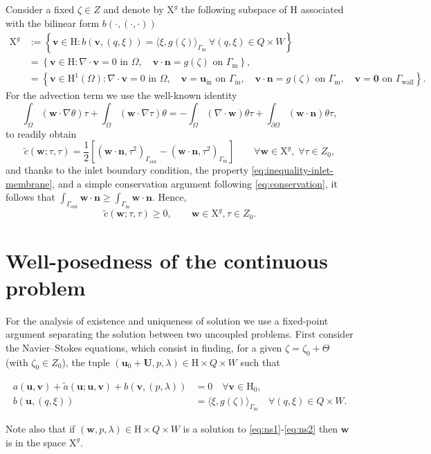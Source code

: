 \documentclass[onefignum,onetabnum,reqno,a4paper,final]{siamart250211}
\def\O{\Omega}
\newcommand\bu{\boldsymbol{u}}
\newcommand\bv{\boldsymbol{v}}
\newcommand\bn{\boldsymbol{n}}
\newcommand\bw{\boldsymbol{w}}
\newcommand\0{\mathbf{0}}
\newcommand\bU{\boldsymbol{U}}
\newcommand\bH{\boldsymbol{\mathrm{H}}}
\newcommand\bX{\boldsymbol{\mathrm{X}}}
\newcommand\bzero{\boldsymbol{0}}
\renewcommand\O{\Omega}
\newcommand\Gm{\Gamma_{\mathrm{m}}}
\newcommand\Gi{\Gamma_{\mathrm{in}}}
\newcommand\Go{\Gamma_{\mathrm{out}}}
\newcommand\Gw{\Gamma_{\mathrm{wall}}}
\newcommand\buin{\boldsymbol{u}_{\mathrm{in}}}
\numberwithin{figure}{section}
\numberwithin{table}{section}
\begin{document}
Consider a fixed $\zeta\in Z$ and denote  by $\bX^g$ the following subspace of $\bH$ associated with the bilinear form  $b(\cdot,(\cdot,\cdot))$ 
\begin{align}
	\label{eq:X}
	\bX^g&:=\left\{\bv\in\bH: b(\bv,(q,\xi))=\langle \xi, g(\zeta)\rangle_{\Gm} \ \forall (q,\xi)\in Q\times W \right\}\nonumber\\
	& =\left\{\bv\in\bH: \nabla\cdot\bv=0 \text{ in }\O,  \quad \bv\cdot\bn =g(\zeta) \text{ on }\Gm\right\},\\
	& =\left\{\bv\in\bH^1(\Omega): \nabla\cdot\bv=0 \text{ in }\O, \quad \bv =\buin \text{ on }\Gi, \quad \bv\cdot\bn= g(\zeta) \text{ on }\Gm, \quad \bv = \bzero  \text{ on }\Gw\right\}.	\nonumber
\end{align}
For the advection term we use the well-known identity 
\[\int_\Omega (\bw \cdot \nabla \theta) \tau + \int_\Omega (\bw \cdot \nabla \tau) \theta  = -\int_\Omega (\nabla\cdot \bw) \theta \tau + \int_{\partial\Omega}(\bw \cdot \bn) \theta \tau, \]
to readily obtain 
\begin{equation}\label{tc-form}
	\widetilde{c}(\bw;\tau,\tau)=\frac{1}{2}[(\bw\cdot\bn,\tau^2)_{\Go} -(\bw\cdot\bn,\tau^2)_{\Gm} ]  \qquad \forall \bw\in\bX^g,\; \forall \tau\in Z_0,
\end{equation}
and thanks to the inlet boundary condition, the property \eqref{eq:inequality-inlet-membrane}, and a simple conservation argument following \eqref{eq:conservation}, it follows that $\int_{\Go}  \bw\cdot\bn \geq \int_{\Gm} \bw\cdot\bn $. Hence,
\begin{equation}\label{eq:ct-pos}
	\widetilde{c}(\bw;\tau,\tau)\geq 0, \qquad \bw\in\bX^g, \tau\in Z_0.
\end{equation}

\section{Well-posedness of the continuous problem}\label{sec:wellp}
For the analysis of existence and uniqueness of solution we use a fixed-point argument separating the solution between two uncoupled problems. First consider the Navier--Stokes equations, which consist in finding, for a given $\zeta = \zeta_0 + \Theta$ (with $\zeta_0\in Z_0$), the tuple  $(\bu_0+\bU,p,\lambda) \in \bH\times Q\times W$ such that   
\begin{linenomath}
	\begin{subequations}
		\begin{align}
			\label{eq:ns1}   a(\bu,\bv)  + \widetilde{a}(\bu;\bu,\bv) 
   + b(\bv,(p,\lambda)) & =0
   \quad \forall \bv \in \bH_0,\\
			\label{eq:ns2}    b(\bu,(q,\xi)) & = \langle \xi, g(\zeta) \rangle_{\Gm} \quad \forall (q,\xi)\in Q\times W.
		\end{align}
\end{subequations}\end{linenomath}
Note also that if $(\bw,p,\lambda)\in \bH\times Q\times W$ is a solution to \eqref{eq:ns1}-\eqref{eq:ns2} then $\bw$ is in the space $\bX^g$. 
\end{document}
